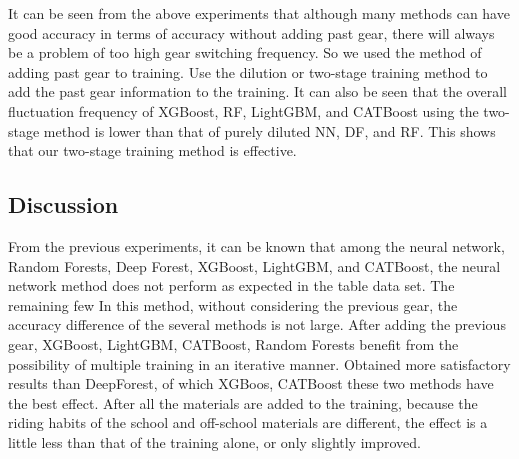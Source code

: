 \documentclass[conference]{IEEEtran}
\begin{document}
It can be seen from the above experiments that although many methods can have good accuracy in terms of accuracy without adding past gear, there will always be a problem of too high gear switching frequency. So we used the method of adding past gear to training. Use the dilution or two-stage training method to add the past gear information to the training. It can also be seen that the overall fluctuation frequency of XGBoost, RF, LightGBM, and CATBoost using the two-stage method is lower than that of purely diluted NN, DF, and RF. This shows that our two-stage training method is effective.

\subsection{Discussion}


From the previous experiments, it can be known that among the neural network, Random Forests, Deep Forest, XGBoost, LightGBM, and CATBoost, the neural network method does not perform as expected in the table data set. The remaining few In this method, without considering the previous gear, the accuracy difference of the several methods is not large. After adding the previous gear, XGBoost, LightGBM, CATBoost, Random Forests benefit from the possibility of multiple training in an iterative manner. Obtained more satisfactory results than DeepForest, of which XGBoos, CATBoost these two methods have the best effect. After all the materials are added to the training, because the riding habits of the school and off-school materials are different, the effect is a little less than that of the training alone, or only slightly improved.
\end{document}
